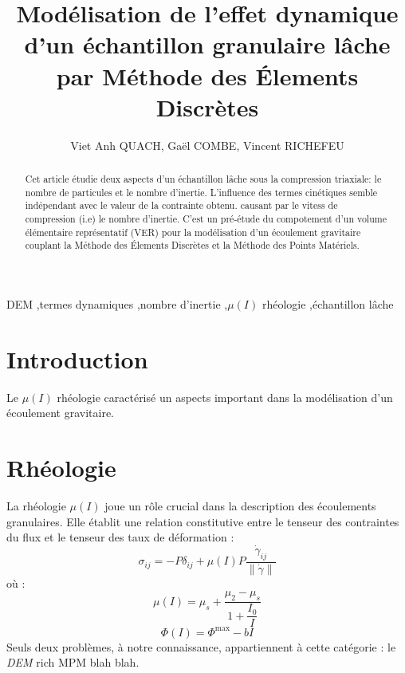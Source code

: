 \documentclass[5p,authoryear,square]{elsarticle}
\begin{document}
\begin{frontmatter}

\title{\textbf{Modélisation de l'effet dynamique d'un échantillon granulaire lâche par Méthode des Élements Discrètes}}

\author{Viet Anh QUACH, Gaël COMBE, Vincent RICHEFEU}
\address{Laboratoire 3SR, Université Grenoble Alpes}


\begin{abstract}
Cet article étudie deux aspects d'un échantillon lâche sous la compression triaxiale: le nombre de particules et le nombre d'inertie. 
L'influence des termes cinétiques semble indépendant avec le valeur de la contrainte obtenu.
 causant par le vitess de compression (i.e) le nombre d'inertie.
C'est un pré-étude du compotement d'un volume élémentaire représentatif (VER) pour la modélisation d'un écoulement gravitaire couplant la Méthode des Élements Discrètes et la Méthode des Points Matériels.

\end{abstract}

\begin{keyword}
DEM \sep termes dynamiques \sep nombre d'inertie \sep $\mu(I)$ rhéologie \sep échantillon lâche
\end{keyword}

\end{frontmatter}

\section{Introduction}\label{introduction}
Le $\mu(I)$ rhéologie caractérisé un aspects important dans la modélisation d'un écoulement gravitaire.  

\section{Rhéologie} \label{rheologie}
La rhéologie $\mu(I)$ joue un rôle crucial dans la description des écoulements granulaires. Elle établit une relation constitutive entre le tenseur des contraintes du flux et le tenseur des taux de déformation  \citep{jop2006constitutive} :
\begin{equation}
\sigma_{ij} = -P \delta_{ij} + \mu(I) P \frac{\dot{\gamma}_{ij}}{\lVert \dot{\gamma} \rVert}
\label{flowTensor}
\end{equation}
où :
\begin{equation}
\mu(I) = \mu_s + \dfrac{\mu_2 - \mu_s}{1 + \dfrac{I_0}{I}}
\label{muI}
\end{equation}
\begin{equation}
\Phi(I) = \Phi^{\max} - bI
\label{phiI}
\end{equation}
Seuls deux problèmes, à notre connaissance, appartiennent à cette catégorie : le \emph{DEM} rich MPM blah blah.
\end{document}
